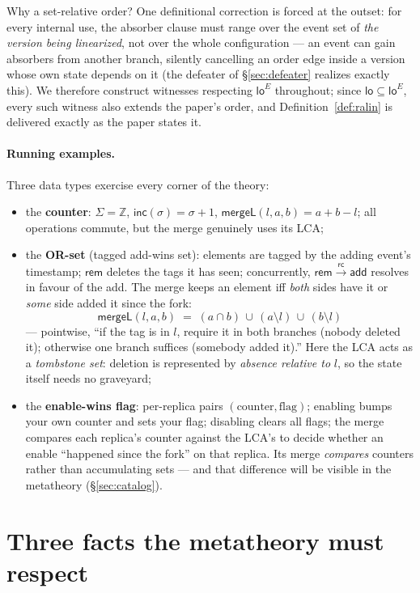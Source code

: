 \documentclass[11pt]{article}
\newcommand{\rc}{\xrightarrow{\mathsf{rc}}}
\newcommand{\add}{\mathsf{add}}
\newcommand{\rem}{\mathsf{rem}}
\newcommand{\mergeL}{\mathsf{mergeL}}
\newcommand{\loE}[1]{\mathsf{lo}^{#1}}
\begin{document}
Why a set-relative order? One definitional correction is forced at the
outset: for every internal use, the absorber clause must range over the
event set of \emph{the version being linearized}, not over the whole
configuration --- an event can gain absorbers from another branch,
silently cancelling an order edge inside a version whose own state
depends on it (the defeater of \S\ref{sec:defeater} realizes exactly
this). We therefore construct witnesses respecting $\loE{E}$ throughout;
since $\mathsf{lo} \subseteq \loE{E}$, every such witness also extends
the paper's order, and Definition~\ref{def:ralin} is delivered exactly
as the paper states it.

\paragraph{Running examples.} Three data types exercise every corner of
the theory:
\begin{itemize}[leftmargin=2em]
\item the \textbf{counter}: $\Sigma = \mathbb{Z}$,
  $\mathsf{inc}(\sigma) = \sigma+1$, $\mergeL(l,a,b) = a+b-l$; all
  operations commute, but the merge genuinely uses its LCA;
\item the \textbf{OR-set} (tagged add-wins set): elements are tagged by
  the adding event's timestamp; $\rem$ deletes the tags it has seen;
  concurrently, $\rem \rc \add$ resolves in favour of the add. The merge
  keeps an element iff \emph{both} sides have it or \emph{some} side added
  it since the fork:
  \[
    \mergeL(l,a,b) \;=\; (a \cap b) \,\cup\, (a \setminus l) \,\cup\, (b
    \setminus l)
  \]
  --- pointwise, ``if the tag is in $l$, require it in both branches
  (nobody deleted it); otherwise one branch suffices (somebody added
  it).'' Here the LCA acts as a \emph{tombstone set}: deletion is
  represented by \emph{absence relative to} $l$, so the state itself needs
  no graveyard;
\item the \textbf{enable-wins flag}: per-replica pairs
  $(\text{counter},\text{flag})$; enabling bumps your own counter and sets
  your flag; disabling clears all flags; the merge compares each
  replica's counter against the LCA's to decide whether an enable
  ``happened since the fork'' on that replica. Its merge \emph{compares}
  counters rather than accumulating sets --- and that difference will be
  visible in the metatheory (\S\ref{sec:catalog}).
\end{itemize}

\section{Three facts the metatheory must respect}
\end{document}
